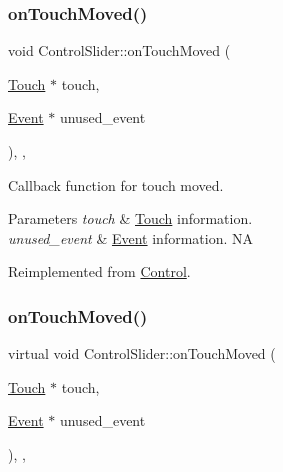 \subsubsection{\texorpdfstring{on\+Touch\+Moved()}{onTouchMoved()}\hspace{0.1cm}{\footnotesize\ttfamily [1/2]}}
{\footnotesize\ttfamily void Control\+Slider\+::on\+Touch\+Moved (\begin{DoxyParamCaption}\item[{\hyperlink{classTouch}{Touch} $\ast$}]{touch,  }\item[{\hyperlink{classEvent}{Event} $\ast$}]{unused\+\_\+event }\end{DoxyParamCaption})\hspace{0.3cm}{\ttfamily [override]}, {\ttfamily [protected]}, {\ttfamily [virtual]}}

Callback function for touch moved.


\begin{DoxyParams}{Parameters}
{\em touch} & \hyperlink{classTouch}{Touch} information. \\
\hline
{\em unused\+\_\+event} & \hyperlink{classEvent}{Event} information.  NA \\
\hline
\end{DoxyParams}


Reimplemented from \hyperlink{classControl_a26d2e6af053319dc605949678f726622}{Control}.

\mbox{\label{classControlSlider_ad7aab266125d50d61a0a58c00f44f94d}} 
\subsubsection{\texorpdfstring{on\+Touch\+Moved()}{onTouchMoved()}\hspace{0.1cm}{\footnotesize\ttfamily [2/2]}}
{\footnotesize\ttfamily virtual void Control\+Slider\+::on\+Touch\+Moved (\begin{DoxyParamCaption}\item[{\hyperlink{classTouch}{Touch} $\ast$}]{touch,  }\item[{\hyperlink{classEvent}{Event} $\ast$}]{unused\+\_\+event }\end{DoxyParamCaption})\hspace{0.3cm}{\ttfamily [override]}, {\ttfamily [protected]}, {\ttfamily [virtual]}}


